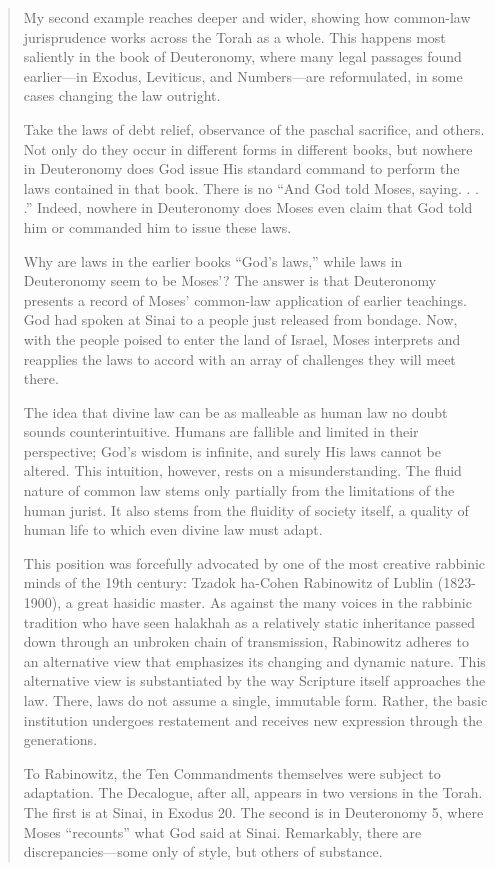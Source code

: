 \documentclass[11pt]{article}
\begin{document}
\begin{quote}
 
My second example reaches deeper and wider, showing how common-law jurisprudence works across the Torah as a whole. This happens most saliently in the book of Deuteronomy, where many legal passages found earlier—in Exodus, Leviticus, and Numbers—are reformulated, in some cases changing the law outright.

Take the laws of debt relief, observance of the paschal sacrifice, and others. Not only do they occur in different forms in different books, but nowhere in Deuteronomy does God issue His standard command to perform the laws contained in that book. There is no “And God told Moses, saying. . . .” Indeed, nowhere in Deuteronomy does Moses even claim that God told him or commanded him to issue these laws. 

Why are laws in the earlier books “God’s laws,” while laws in Deuteronomy seem to be Moses’? The answer is that Deuteronomy presents a record of Moses’ common-law application of earlier teachings. God had spoken at Sinai to a people just released from bondage. Now, with the people poised to enter the land of Israel, Moses interprets and reapplies the laws to accord with an array of challenges they will meet there.

The idea that divine law can be as malleable as human law no doubt sounds counterintuitive. Humans are fallible and limited in their perspective; God’s wisdom is infinite, and surely His laws cannot be altered. This intuition, however, rests on a misunderstanding. The fluid nature of common law stems only partially from the limitations of the human jurist. It also stems from the fluidity of society itself, a quality of human life to which even divine law must adapt.

This position was forcefully advocated by one of the most creative rabbinic minds of the 19th century: Tzadok ha-Cohen Rabinowitz of Lublin (1823-1900), a great hasidic master. As against the many voices in the rabbinic tradition who have seen halakhah as a relatively static inheritance passed down through an unbroken chain of transmission, Rabinowitz adheres to an alternative view that emphasizes its changing and dynamic nature. This alternative view is substantiated by the way Scripture itself approaches the law. There, laws do not assume a single, immutable form. Rather, the basic institution undergoes restatement and receives new expression through the generations. 

To Rabinowitz, the Ten Commandments themselves were subject to adaptation. The Decalogue, after all, appears in two versions in the Torah. The first is at Sinai, in Exodus 20. The second is in Deuteronomy 5, where Moses “recounts” what God said at Sinai. Remarkably, there are discrepancies—some only of style, but others of substance. 


\end{quote}
\end{document}

